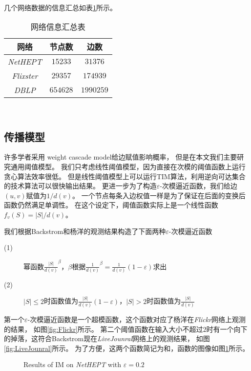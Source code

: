 几个网络数据的信息汇总如表\ref{tab:net_info}所示。
\begin{table}[h]
	\centering
	\caption{网络信息汇总表}
	\label{tab:net_info}
	\begin{minipage}[t]{0.8\textwidth} 
		\begin{tabular}{|c|c|c|}
			\hline
			网络  &  节点数   &   边数\\ \hline
			{\em NetHEPT}  &  $15233$   &   $31376$ \\ \hline
			{\em Flixster}  &  $29357$   &   $174939$ \\ \hline
			{\em DBLP}   &   $654628$   &   $1990259$ \\
			\hline
		\end{tabular}\\[2pt]
	\end{minipage}
\end{table}

\subsection{传播模型}
许多学者采用 weight cascade model\cite{Kempe2003maximizing}给边赋值影响概率，
但是在本文我们主要研究通用阈值模型。
我们只考虑线性阈值模型\cite{Kempe2003maximizing}，因为直接在次模的阈值函数上运行贪心算法效率很低。
但是线性阈值模型上可以运行TIM算法，利用逆向可达集合的技术算法可以很快输出结果。
更进一步为了构造$\varepsilon$-次模逼近函数，我们给边$(u,v)$赋值为$1/d(v)$。
一个节点每条入边权值一样是为了保证在后面的变换后函数仍然满足单调性。
在这个设定下，阈值函数实际上是一个线性函数$f_v(S) = |S|/d(v)$。

我们根据Backstrom\cite{backstrom2006group}和杨洋\cite{yang2016role}的观测结果构造了下面两种$\varepsilon$-次模逼近函数
\begin{description}
\item[(1)] 幂函数$\frac{|S|}{d(v)}^{\beta}$，$\beta$根据$\frac{1}{d(v)}^{\beta}=\frac{1}{d(v)}(1-\varepsilon)$求出
\item[(2)] $|S| \leq 2$时函数值为$\frac{|S|}{d(v)}(1-\varepsilon)$，$|S| > 2$时函数值为$\frac{|S|}{d(v)}$
\end{description}
第一个$\varepsilon$-次模逼近函数是一个超模函数，这个函数对应了杨洋\cite{yang2016role}在{\em Flickr}网络上观测的结果，
如图\ref{fig:Flickr}所示。
第二个阈值函数在输入大小不超过$2$时有一个向下的掉落，这符合Backstrom\cite{backstrom2006group}现在{\em LiveJounral}网络上的观测结果，
如图\ref{fig:LiveJounral}所示。
为了方便，这两个函数简记为\easso 和\easst ，函数的图像如图\ref{fig:eas12}所示。
\begin{figure}[h]
\centering
	\caption{Results of IM on {\em NetHEPT} with $\varepsilon=0.2$}
	\label{fig:eas12}
\end{figure}

